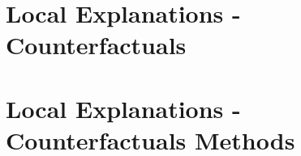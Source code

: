 \documentclass[11pt,compress,t,notes=noshow, aspectratio=169, xcolor=table]{beamer}
\begin{document}


\section{Local Explanations - Counterfactuals}


\section{Local Explanations - Counterfactuals Methods}

\end{document}
